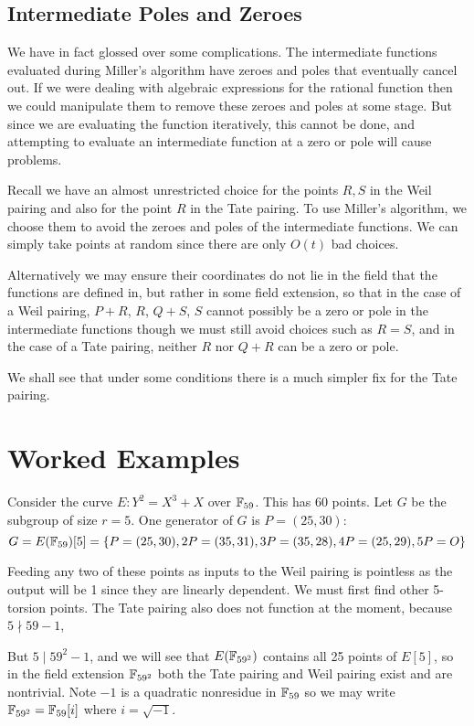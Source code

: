 \subsection {Intermediate Poles and Zeroes}

We have in fact glossed over some complications.
The intermediate functions evaluated during Miller's algorithm have zeroes
and poles that eventually cancel out. If we were dealing with algebraic
expressions for the rational function then we could manipulate
them to remove these zeroes and poles at some stage.
But since we are evaluating the function iteratively,
this cannot be done, and attempting to evaluate an
intermediate function at a zero
or pole will cause problems.

Recall we have an almost unrestricted choice for the points $R, S$ in
the Weil pairing and also for the point $R$
in the Tate pairing. To use Miller's algorithm, we choose them
to avoid the zeroes and poles of the intermediate functions. We can simply
take points at random since there are only $O(t)$ bad choices.

Alternatively we may ensure their coordinates do not lie in the
field that the functions are defined in, but rather in some field
extension, so that in the case of a Weil pairing, $P+R$, $R$, $Q+S$, $S$
cannot possibly be a zero or pole in the intermediate functions
though we must still avoid choices such as $R = S$,
and in the case of a Tate pairing, neither $R$ nor $Q + R$
can be a zero or pole.

We shall see that under some conditions there is a much simpler fix
for the Tate pairing.

\section {Worked Examples}

Consider the curve $E : Y^2 = X^3 + X$ over $\mathbb{F}_{59}$.
This has 60 points. Let $G$ be the subgroup of size $r = 5$.
One generator of $G$ is $P = (25, 30)$:
\[ G =
E(\mathbb{F}_{59})[5] =
\{P = (25, 30), 2P = (35, 31), 3P = (35, 28), 4P = (25, 29), 5P = O \} \]

Feeding any two of these points as inputs to the Weil pairing is pointless
as the output will be 1 since they are linearly dependent. We must first
find other 5-torsion points.
The Tate pairing also does not function at the moment, because $5 \nmid 59 - 1$,

But $5 \mid 59^2 - 1$, and we will see that $E(\mathbb{F}_{59^2})$ contains
all 25 points of $E[5]$, so in the field extension $\mathbb{F}_{59^2}$
both the Tate pairing
and Weil pairing exist and are nontrivial.
Note $-1$ is a quadratic nonresidue in $\mathbb{F}_{59}$
so we may write $\mathbb{F}_{59^2} = \mathbb{F}_{59}[i]$ where $i = \sqrt{-1}$.

